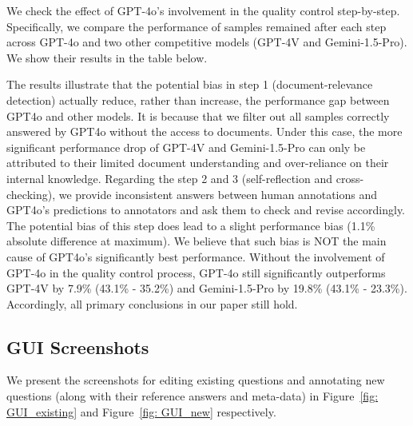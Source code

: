 We check the effect of GPT-4o's involvement in the quality control step-by-step. Specifically, we compare the performance of samples remained after each step across GPT-4o and two other competitive models (GPT-4V and Gemini-1.5-Pro). We show their results in the table below.

\begin{table}[!htbp]
    \centering
    \vspace{1em}
    \caption{Step-wise performance comparison with and without LVLM-based quality checking}
    \label{tab:perform_compare}
\end{table}

The results illustrate that the potential bias in step 1 (document-relevance detection) actually reduce, rather than increase, the performance gap between GPT4o and other models. It is because that we filter out all samples correctly answered by GPT4o without the access to documents. Under this case, the more significant performance drop of GPT-4V and Gemini-1.5-Pro can only be attributed to their limited document understanding and over-reliance on their internal knowledge. Regarding the step 2 and 3 (self-reflection and cross-checking), we provide inconsistent answers between human annotations and GPT4o's predictions to annotators and ask them to check and revise accordingly. The potential bias of this step does lead to a slight performance bias (1.1\% absolute difference at maximum). We believe that such bias is NOT the main cause of GPT4o's significantly best performance. Without the involvement of GPT-4o in the quality control process, GPT-4o still significantly outperforms GPT-4V by 7.9\% (43.1\% - 35.2\%) and Gemini-1.5-Pro by 19.8\% (43.1\% - 23.3\%). Accordingly, all primary conclusions in our paper still hold.


\clearpage
\subsection{GUI Screenshots}
\label{appendix: GUI Screenshots}
We present the screenshots for editing existing questions and annotating new questions (along with their reference answers and meta-data) in Figure~\ref{fig: GUI_existing} and Figure~\ref{fig: GUI_new} respectively.

